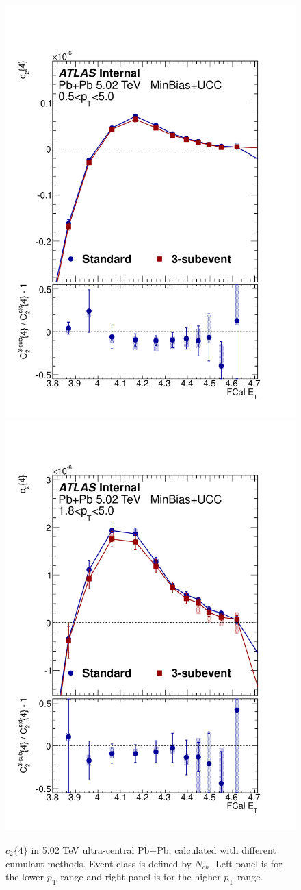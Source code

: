 \begin{figure}[H]
\centering
\includegraphics[width=.45\linewidth]{figs/sec_result/PbPb502_UCC_Nch/PbPb502_mtd_Har2_pt0.pdf}
\includegraphics[width=.45\linewidth]{figs/sec_result/PbPb502_UCC_Nch/PbPb502_mtd_Har2_pt5.pdf}
\caption{$c_2\{4\}$ in 5.02 TeV ultra-central Pb+Pb, calculated with different cumulant methods. Event class is defined by $N_{ch}$. Left panel is for the lower $p_\text{T}$ range and right panel is for the higher $p_\text{T}$ range.}
\label{fig:PbPb502_UCC_FCal_v2_mtd}
\end{figure}

